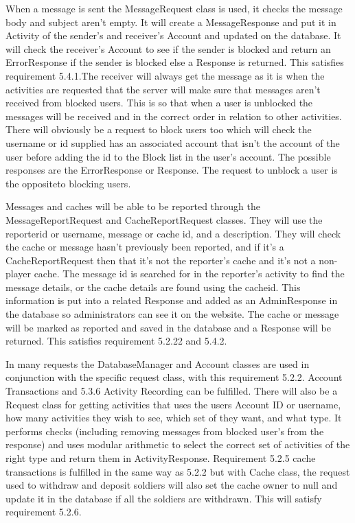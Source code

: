 When a message is sent the MessageRequest class is used, it checks the message body and subject aren't empty. It will create a MessageResponse and put it in Activity of the sender's and receiver's Account and updated on the database. It will check the receiver's Account to see if the sender is blocked and return an ErrorResponse if the sender is blocked else a Response is returned. This satisfies requirement 5.4.1.The receiver will always get the message as it is when the activities are requested that the server will make sure that messages aren't received from blocked users. This is so that when a user is unblocked the messages will be received and in the correct order in relation to other activities. There will obviously be a request to block users too which will check the username or id supplied has an associated account that isn't the account of the user before adding the id to the Block list in the user's account. The possible responses are the ErrorResponse or Response. The request to unblock a user is the oppositeto blocking users.

Messages and caches will be able to be reported through the MessageReportRequest and CacheReportRequest classes. They will use the reporterid or username, message or cache id, and a description. They will check the cache or message hasn't previously been reported, and if it's a CacheReportRequest then that it's not the reporter's cache and it's not a non-player cache. The message id is searched for in the reporter's activity to find the message details, or the cache details are found using the cacheid. This information is put into a related Response and added as an AdminResponse in the database so administrators can see it on the website. The cache or message will be marked as reported and saved in the database and a Response will be returned. This satisfies requirement 5.2.22 and 5.4.2.

In many requests the DatabaseManager and Account classes are used in conjunction with the specific request class, with this requirement 5.2.2. Account Transactions and 5.3.6 Activity Recording can be fulfilled. There will also be a Request class for getting activities that uses the users Account ID or username, how many activities they wish to see, which set of they want, and what type. It performs checks (including removing messages from blocked user's from the response) and uses modular arithmetic to select the correct set of activities of the right type and return them in ActivityResponse. Requirement 5.2.5 cache transactions is fulfilled in the same way as 5.2.2 but with Cache class, the request used to withdraw and deposit soldiers will also set the cache owner to null and update it in the database if all the soldiers are withdrawn. This will satisfy requirement 5.2.6.

